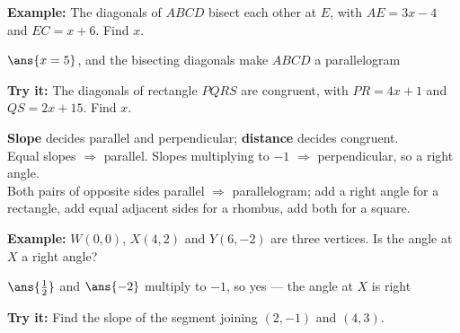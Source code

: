 \documentclass[12pt]{article}
\begin{document}
\begin{examplebox}
\textbf{Example:} \quad The diagonals of $ABCD$ bisect each other at $E$, with
$AE = 3x - 4$ and $EC = x + 6$. Find $x$.
\begin{center}
\end{center}

$\ans{x = 5}$, and the bisecting diagonals make $ABCD$ a parallelogram
\end{examplebox}

\begin{tryitbox}
\textbf{Try it:} \quad The diagonals of rectangle $PQRS$ are congruent, with
$PR = 4x + 1$ and $QS = 2x + 15$. Find $x$.\\[2pt]
\end{tryitbox}


\begin{formulabox}
\textbf{Slope} decides parallel and perpendicular; \textbf{distance} decides
congruent.\\[3pt]
Equal slopes $\Rightarrow$ parallel. \quad Slopes multiplying to $-1$
$\Rightarrow$ perpendicular, so a right angle.\\[2pt]
Both pairs of opposite sides parallel $\Rightarrow$ parallelogram; add a right
angle for a rectangle, add equal adjacent sides for a rhombus, add both for a
square.
\end{formulabox}

\begin{examplebox}
\textbf{Example:} \quad $W(0, 0)$, $X(4, 2)$ and $Y(6, -2)$ are three vertices.
Is the angle at $X$ a right angle?

$\ans{\tfrac{1}{2}}$ and $\ans{-2}$ multiply to $-1$, so yes --- the angle at
$X$ is right
\end{examplebox}

\begin{tryitbox}
\textbf{Try it:} \quad Find the slope of the segment joining $(2, -1)$ and
$(4, 3)$.\\[2pt]
\end{tryitbox}
\end{document}

